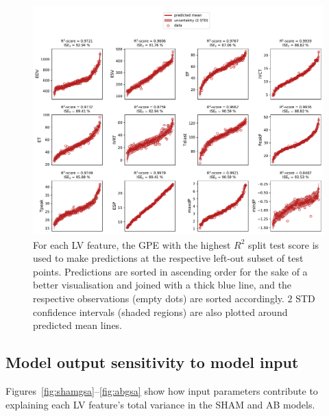 \begin{figure}[!ht]
    \myfloatalign
    \includegraphics[width=\textwidth]{figures/chapter04/bgpes_vs_bsplit_ab.pdf}
    \caption{For each LV feature, the GPE with the highest $R^2$ split test score is used to make predictions at the respective left-out subset of test points. Predictions are sorted in ascending order for the sake of a better visualisation and joined with a thick blue line, and the respective observations (empty dots) are sorted accordingly. $2$ STD confidence intervals (shaded regions) are also plotted around predicted mean lines.}
    \label{fig:gpesexampleinferenceab}
\end{figure}


%
%
%
\subsection{Model output sensitivity to model input}
Figures~\ref{fig:shamgsa}--\ref{fig:abgsa} show how input parameters contribute to explaining each LV feature's total variance in the SHAM and AB models.

